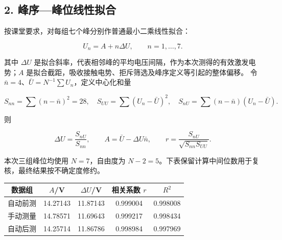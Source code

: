 \subsection*{2. 峰序—峰位线性拟合}

按课堂要求，对每组七个峰分别作普通最小二乘线性拟合：

\begin{equation}
U_n=A+n\Delta U,\qquad n=1,\ldots,7.
\end{equation}

其中 $\Delta U$ 是拟合斜率，代表相邻峰的平均电压间隔，作为本次测得的有效激发电势；$A$ 是拟合截距，吸收接触电势、拒斥筛选及峰序定义等引起的整体偏移。
令 $\bar n=4$、$\bar U=N^{-1}\sum U_n$，定义中心化和量

\begin{equation}
S_{nn}=\sum(n-\bar n)^2=28,
\quad S_{UU}=\sum(U_n-\bar U)^2,
\quad S_{nU}=\sum(n-\bar n)(U_n-\bar U).
\end{equation}

则

\begin{equation}
\Delta U=\frac{S_{nU}}{S_{nn}},\qquad
A=\bar U-\Delta U\bar n,\qquad
r=\frac{S_{nU}}{\sqrt{S_{nn}S_{UU}}}.
\end{equation}

本次三组峰位均使用 $N=7$，自由度为 $N-2=5$。下表保留计算中间位数用于复核，最终结果按不确定度修约。

\begin{center}
\begin{minipage}{\linewidth}
\centering

{\small
\setlength{\tabcolsep}{6pt}
\renewcommand{\arraystretch}{1.15}
\begin{tabular}{ccccc}
\toprule

数据组 & $A$/V & $\Delta U$/V & 相关系数 $r$ & $R^2$ \\

\midrule

自动前测 & 14.27143 & 11.87143 & 0.999004 & 0.998008 \\

手动测量 & 14.78571 & 11.69643 & 0.999217 & 0.998434 \\

自动后测 & 14.25714 & 11.86786 & 0.998984 & 0.997969 \\

\bottomrule

\end{tabular}
}

\end{minipage}
\end{center}


